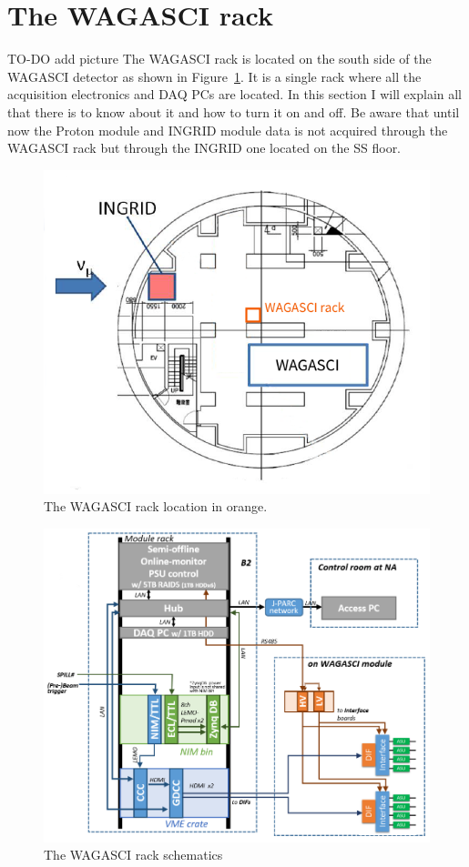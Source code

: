 \section{The WAGASCI rack}
TO-DO add picture The WAGASCI rack is located on the south side of the WAGASCI
detector as shown in Figure~\ref{fig:WAGASCI-rack-location}. It is a single rack
where all the acquisition electronics and DAQ PCs are located. In this section I
will explain all that there is to know about it and how to turn it on and
off. Be aware that until now the Proton module and INGRID module data is not
acquired through the WAGASCI rack but through the INGRID one located on the SS
floor.
\begin{figure}[H]
  \centering \includegraphics[width=0.6\linewidth]{WAGASCI-rack-location}
  \caption{The WAGASCI rack location in orange.}\label{fig:WAGASCI-rack-location}
\end{figure}
\begin{figure}[H]
  \centering \includegraphics[width=\linewidth]{whole-system}
  \caption{The WAGASCI rack schematics}\label{fig:whole-system}
\end{figure}

